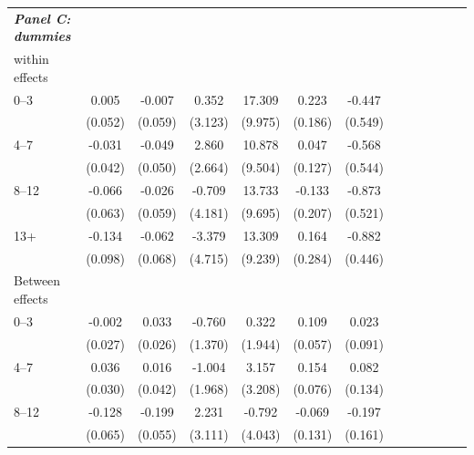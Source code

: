 \documentclass[12pt,english]{article}
\begin{document}
\begin{table}[!ht]
\begin{center}
\begin{adjustbox}{max width=.9\linewidth}
\begin{threeparttable}
{\begin{tabular}{l*{6}{S S}}
						\textit{\textbf{Panel C: dummies}} &&&&&&\\
						within effects&                  &                  &                  &                  &                  &                  \\
						0--3&    0.005         &   -0.007         &    0.352         &   17.309\sym{*}  &    0.223         &   -0.447         \\
						&  (0.052)         &  (0.059)         &  (3.123)         &  (9.975)         &  (0.186)         &  (0.549)         \\
						4--7&    -0.031         &   -0.049         &    2.860         &   10.878         &    0.047         &   -0.568         \\
						&  (0.042)         &  (0.050)         &  (2.664)         &  (9.504)         &  (0.127)         &  (0.544)         \\
						8--12&    -0.066         &   -0.026         &   -0.709         &   13.733         &   -0.133         &   -0.873\sym{*}  \\
						&  (0.063)         &  (0.059)         &  (4.181)         &  (9.695)         &  (0.207)         &  (0.521)         \\
						13+&   -0.134         &   -0.062         &   -3.379         &   13.309         &    0.164         &   -0.882\sym{**} \\
						&  (0.098)         &  (0.068)         &  (4.715)         &  (9.239)         &  (0.284)         &  (0.446)         \\
						Between effects&                  &                  &                  &                  &                  &                  \\
						0--3&      -0.002         &    0.033         &   -0.760         &    0.322         &    0.109\sym{*}  &    0.023         \\
						&  (0.027)         &  (0.026)         &  (1.370)         &  (1.944)         &  (0.057)         &  (0.091)         \\
						4--7&    0.036         &    0.016         &   -1.004         &    3.157         &    0.154\sym{**} &    0.082         \\
						&  (0.030)         &  (0.042)         &  (1.968)         &  (3.208)         &  (0.076)         &  (0.134)         \\
						8--12&  -0.128\sym{**} &   -0.199\sym{***}&    2.231         &   -0.792         &   -0.069         &   -0.197         \\
						&  (0.065)         &  (0.055)         &  (3.111)         &  (4.043)         &  (0.131)         &  (0.161)         \\

\end{tabular}}
\end{threeparttable}
\end{adjustbox}
\end{center}
\end{table}
\end{document}
